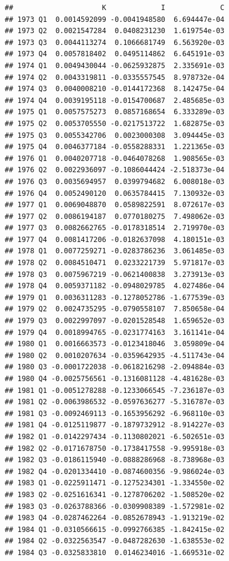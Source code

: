 \documentclass[12pt,a4paper,]{article}
\newcommand{\0}{\mathbf{0}}
\begin{document}
\begin{verbatim}
##                     K             I             C
## 1973 Q1  0.0014592099 -0.0041948580  6.694447e-04
## 1973 Q2  0.0021547284  0.0408231230  1.619754e-03
## 1973 Q3  0.0044113274  0.1066681749  6.563920e-03
## 1973 Q4  0.0057818402  0.0495114862  6.645191e-03
## 1974 Q1  0.0049430044 -0.0625932875  2.335691e-03
## 1974 Q2  0.0043319811 -0.0335557545  8.978732e-04
## 1974 Q3  0.0040008210 -0.0144172368  8.142475e-04
## 1974 Q4  0.0039195118 -0.0154700687  2.485685e-03
## 1975 Q1  0.0057575273  0.0857168654  6.333289e-03
## 1975 Q2  0.0053705550 -0.0217513722  1.682875e-03
## 1975 Q3  0.0055342706  0.0023000308  3.094445e-03
## 1975 Q4  0.0046377184 -0.0558288331  1.221365e-03
## 1976 Q1  0.0040207718 -0.0464078268  1.908565e-03
## 1976 Q2  0.0022936097 -0.1086044424 -2.518373e-04
## 1976 Q3  0.0035694957  0.0399794682  6.008018e-03
## 1976 Q4  0.0052490120  0.0635784415  7.130932e-03
## 1977 Q1  0.0069048870  0.0589822591  8.072617e-03
## 1977 Q2  0.0086194187  0.0770180275  7.498062e-03
## 1977 Q3  0.0082662765 -0.0178318514  2.719970e-03
## 1977 Q4  0.0081417206 -0.0182637098  4.180151e-03
## 1978 Q1  0.0077259271 -0.0283786236  3.061485e-03
## 1978 Q2  0.0084510471  0.0233221739  5.971817e-03
## 1978 Q3  0.0075967219 -0.0621400838  3.273913e-03
## 1978 Q4  0.0059371182 -0.0948029785  4.027486e-04
## 1979 Q1  0.0036311283 -0.1278052786 -1.677539e-03
## 1979 Q2  0.0024735295 -0.0790558107  7.850658e-04
## 1979 Q3  0.0022997097 -0.0201528548  1.659652e-03
## 1979 Q4  0.0018994765 -0.0231774163  3.161141e-04
## 1980 Q1  0.0016663573 -0.0123418046  3.059809e-04
## 1980 Q2  0.0010207634 -0.0359642935 -4.511743e-04
## 1980 Q3 -0.0001722038 -0.0618216298 -2.094884e-03
## 1980 Q4 -0.0025756561 -0.1316081128 -4.481628e-03
## 1981 Q1 -0.0051278288 -0.1233066545 -7.236187e-03
## 1981 Q2 -0.0063986532 -0.0597636277 -5.316787e-03
## 1981 Q3 -0.0092469113 -0.1653956292 -6.968110e-03
## 1981 Q4 -0.0125119877 -0.1879732912 -8.914227e-03
## 1982 Q1 -0.0142297434 -0.1130802021 -6.502651e-03
## 1982 Q2 -0.0171678750 -0.1738417558 -9.995918e-03
## 1982 Q3 -0.0186115940 -0.0888286968 -8.738968e-03
## 1982 Q4 -0.0201334410 -0.0874600356 -9.986024e-03
## 1983 Q1 -0.0225911471 -0.1275234301 -1.334550e-02
## 1983 Q2 -0.0251616341 -0.1278706202 -1.508520e-02
## 1983 Q3 -0.0263788366 -0.0309908389 -1.572981e-02
## 1983 Q4 -0.0287462264 -0.0852678943 -1.913219e-02
## 1984 Q1 -0.0310566615 -0.0992766385 -1.842415e-02
## 1984 Q2 -0.0322563547 -0.0487282630 -1.638553e-02
## 1984 Q3 -0.0325833810  0.0146234016 -1.669531e-02

\end{verbatim}
\end{document}
